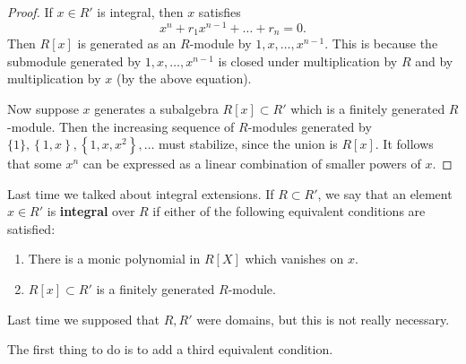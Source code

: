 \begin{proof} 
If $x  \in R'$ is integral, then $x$ satisfies
\[ x^n + r_1 x^{n-1}+\dots+r_n = 0.  \]
Then $R[x]$ is generated as an $R$-module by $1, x, \dots, x^{n-1}$.  This is
because the submodule generated by $1, x ,\dots, x^{n-1}$ is closed under
multiplication by $R$ and by multiplication by $x$ (by the above equation). 

Now suppose $x$ generates a subalgebra $R[x] \subset R'$ which is a finitely
generated $R$-module.  Then the increasing sequence
of $R$-modules generated by $\{1\}, \left\{1, x\right\}, \left\{1, x, x^2\right\}
, \dots$ must stabilize, since the union is $R[x]$.  It follows that some $x^n$
can be expressed as a linear combination of smaller powers of $x$. 
\end{proof} 

Last time we talked about integral extensions. If $R \subset R'$, we say that
an element $x \in R'$ is \textbf{integral} over $R$ if either of the following
equivalent conditions are satisfied:

\begin{enumerate}
\item There is a monic polynomial in $R[X]$ which vanishes on $x$.
\item $R[x] \subset R'$ is a finitely generated $R$-module.
\end{enumerate}

Last time we supposed that $R, R'$ were domains, but this is not really
necessary.

The first thing to do is to add a third equivalent condition.

